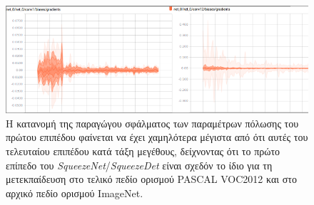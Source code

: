 \begin{figure}
\centering
\includegraphics[width = \textwidth]{figures/transferLearning/conv1_vs_conv12_biases_gradients.png}
\caption[Οι κατανομές των παραμέτρων του πρώτου και του τελευταίου επιπέδου]{Η κατανομή της παραγώγου σφάλματος των παραμέτρων πόλωσης του πρώτου επιπέδου φαίνεται να έχει χαμηλότερα μέγιστα από ότι αυτές του τελευταίου επιπέδου κατά τάξη μεγέθους, δείχνοντας ότι το πρώτο επίπεδο του \textit{SqueezeNet}/\textit{SqueezeDet} είναι σχεδόν το ίδιο για τη μετεκπαίδευση στο τελικό πεδίο ορισμού PASCAL VOC2012 \cite{57} και στο αρχικό πεδίο ορισμού ImageNet.}
\label{fig:conv1_vs_conv12_biases_gradients}
\end{figure}

